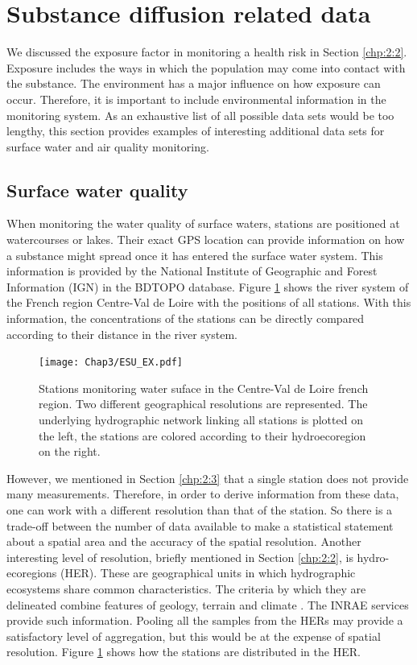 \section{Substance diffusion related data}\label{chp:2:4}

We discussed the exposure factor in monitoring a health risk in Section \ref{chp:2:2}. Exposure includes the ways in which the population may come into contact with the substance. The environment has a major influence on how exposure can occur. Therefore, it is important to include environmental information in the monitoring system. As an exhaustive list of all possible data sets would be too lengthy, this section provides examples of interesting additional data sets for surface water and air quality monitoring.

\subsection{Surface water quality}

When monitoring the water quality of surface waters, stations are positioned at watercourses or lakes. Their exact GPS location can provide information on how a substance might spread once it has entered the surface water system. This information is provided by the National Institute of Geographic and Forest Information (IGN) in the BDTOPO database. Figure \ref{fig:esu_ex} shows the river system of the French region Centre-Val de Loire with the positions of all stations. With this information, the concentrations of the stations can be directly compared according to their distance in the river system. 

\begin{figure}[ht]
    \centering
    \texttt{[image: Chap3/ESU\_EX.pdf]}
    \caption{Stations monitoring water suface in the Centre-Val de Loire french region. Two different geographical resolutions are represented. The underlying hydrographic network linking all stations is plotted on the left, the stations are colored according to their hydroecoregion on the right.}
    \label{fig:esu_ex}
\end{figure}

However, we mentioned in Section \ref{chp:2:3} that a single station does not provide many measurements. Therefore, in order to derive information from these data, one can work with a different resolution than that of the station. So there is a trade-off between the number of data available to make a statistical statement about a spatial area and the accuracy of the spatial resolution. Another interesting level of resolution, briefly mentioned in Section \ref{chp:2:2}, is hydro-ecoregions (HER). These are geographical units in which hydrographic ecosystems share common characteristics. The criteria by which they are delineated combine features of geology, terrain and climate \cite{wasson:hal-02580774}. The INRAE services provide such information. Pooling all the samples from the HERs may provide a satisfactory level of aggregation, but this would be at the expense of spatial resolution. Figure \ref{fig:esu_ex} shows how the stations are distributed in the HER.

